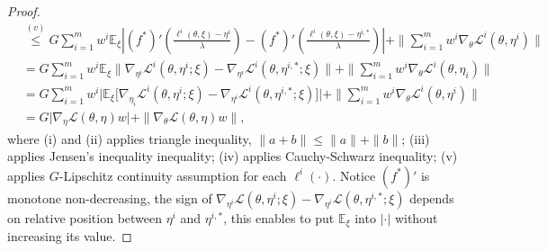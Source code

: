 \documentclass[twoside]{article} %
\theoremstyle{plain}
\theoremstyle{definition}
\theoremstyle{remark}
\newcommand{\fL}{\mathcal{L}}
\begin{document}
\begin{proof}
\begin{align}
    & \overset{(v)}{\leq} G \sum_{i=1}^{m} w^i \mathbb{E}_{\xi}|(f^*)'(\frac{\ell^i({\theta}, \xi)-\eta^i}{\lambda}) - (f^*)'(\frac{\ell^i({\theta}, \xi)-\eta^{i,*}}{\lambda}) |+ \|\sum_{i=1}^{m}w^i\nabla_{{\theta}} \fL^i({\theta},\eta^i) \|\nonumber \\
    & = G \sum_{i=1}^{m} w^i \mathbb{E}_{\xi}\|\nabla_{\eta^i}\fL^{i}({\theta}, \eta^i;\xi) - \nabla_{\eta^i}\fL^{i}({\theta}, \eta^{i,*};\xi) \|+\| \sum_{i=1}^{m} w^i \nabla_{{\theta}}\fL^i({\theta}, \eta_i)\| \nonumber \\
    & = G \sum_{i=1}^{m} w^i \big|\mathbb{E}_{\xi}\big[\nabla_{\eta_i} \fL^i({\theta},\eta^i;\xi)- \nabla_{\eta^i}\fL^i({\theta}, \eta^{i,*};\xi) \big] \big| + \|\sum_{i=1}^{m}w^i \nabla_{{\theta}} \fL^i({\theta}, \eta^i) \| \nonumber\\
    &= G  \big|\nabla_{\eta} \fL({\theta}, \eta) w\big|+ \|  \nabla_{{\theta}}\fL({\theta},\eta)w  \|,
\end{align}
where (i) and (ii) applies triangle inequality, $\|a+b \|\leq \| a\|+\| b\|$; (iii) applies Jensen's inequality inequality; (iv) applies Cauchy-Schwarz inequality; (v) applies $G$-Lipschitz continuity assumption for each $\ell^i(\cdot)$. Notice $(f^*)'$ is monotone non-decreasing, the sign of $\nabla_{\eta^i}\fL(\theta,\eta^i;\xi)-\nabla_{\eta^i}\fL(\theta,\eta^{i,*};\xi)$ depends on relative position between $\eta^i$ and $\eta^{i,*}$, this enables to put $\mathbb{E}_{\xi}$ into $|\cdot|$ without increasing its value.


\end{proof}
\end{document}
